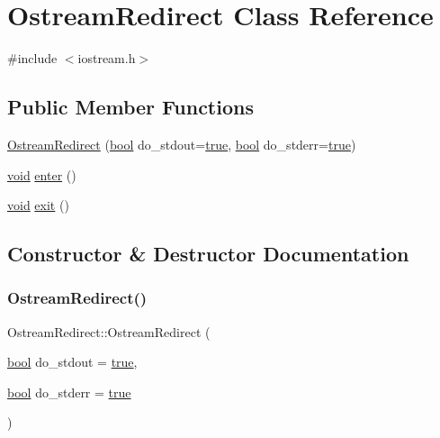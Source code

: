 \hypertarget{class_ostream_redirect}{}\section{Ostream\+Redirect Class Reference}
\label{class_ostream_redirect}


{\ttfamily \#include $<$iostream.\+h$>$}

\subsection*{Public Member Functions}
\begin{DoxyCompactItemize}
\item 
\mbox{\hyperlink{class_ostream_redirect_a7bebe8402ded70194fe05724f5a0fe10}{Ostream\+Redirect}} (\mbox{\hyperlink{asdl_8h_af6a258d8f3ee5206d682d799316314b1}{bool}} do\+\_\+stdout=\mbox{\hyperlink{asdl_8h_af6a258d8f3ee5206d682d799316314b1a08f175a5505a10b9ed657defeb050e4b}{true}}, \mbox{\hyperlink{asdl_8h_af6a258d8f3ee5206d682d799316314b1}{bool}} do\+\_\+stderr=\mbox{\hyperlink{asdl_8h_af6a258d8f3ee5206d682d799316314b1a08f175a5505a10b9ed657defeb050e4b}{true}})
\item 
\mbox{\hyperlink{_s_d_l__opengles2__gl2ext_8h_ae5d8fa23ad07c48bb609509eae494c95}{void}} \mbox{\hyperlink{class_ostream_redirect_a3cf2fbfe1135bba2c83297b80a12517c}{enter}} ()
\item 
\mbox{\hyperlink{_s_d_l__opengles2__gl2ext_8h_ae5d8fa23ad07c48bb609509eae494c95}{void}} \mbox{\hyperlink{class_ostream_redirect_afc4e2df991c8740540abbae9731607ff}{exit}} ()
\end{DoxyCompactItemize}


\subsection{Constructor \& Destructor Documentation}
\mbox{\label{class_ostream_redirect_a7bebe8402ded70194fe05724f5a0fe10}} 
\subsubsection{\texorpdfstring{OstreamRedirect()}{OstreamRedirect()}}
{\footnotesize\ttfamily Ostream\+Redirect\+::\+Ostream\+Redirect (\begin{DoxyParamCaption}\item[{\mbox{\hyperlink{asdl_8h_af6a258d8f3ee5206d682d799316314b1}{bool}}}]{do\+\_\+stdout = {\ttfamily \mbox{\hyperlink{asdl_8h_af6a258d8f3ee5206d682d799316314b1a08f175a5505a10b9ed657defeb050e4b}{true}}},  }\item[{\mbox{\hyperlink{asdl_8h_af6a258d8f3ee5206d682d799316314b1}{bool}}}]{do\+\_\+stderr = {\ttfamily \mbox{\hyperlink{asdl_8h_af6a258d8f3ee5206d682d799316314b1a08f175a5505a10b9ed657defeb050e4b}{true}}} }\end{DoxyParamCaption})\hspace{0.3cm}{\ttfamily [inline]}}



